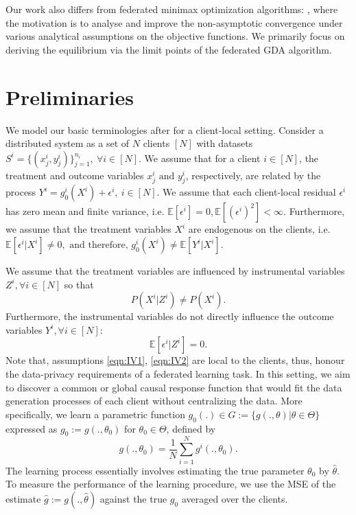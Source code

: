 \documentclass{article}
\let\cite\relax
\newcommand*{\cite}{\citep}
\newcommand{\E}{\mathbb{E}}
\theoremstyle{definition}
\begin{document}
Our work also differs from federated minimax optimization algorithms: \citet{sharma2022federated, shen2024stochastic, wu2024solving, zhu2024stability}, where the motivation is to analyse and improve the non-asymptotic convergence under various analytical assumptions on the objective functions. We primarily focus on deriving the equilibrium via the limit points of the federated GDA algorithm.



\section{Preliminaries}
\label{sec:prelim}		
We model our basic terminologies after \cite{bennett2019deep} for a client-local setting. Consider a distributed system as a set of $N$ clients $[N]$ with datasets $S^i = \{(x_j^i,y_j^i)\}_{j=1}^{n_i},~\forall i\in[N]$. We assume that for a client $i\in[N]$, the treatment and outcome variables $x_j^i\text{ and }y_j^i$, respectively, are related by the process $
	Y^i=g_0^i(X^i) + \epsilon^i, ~i \in [N].
$
We assume that each client-local residual $\epsilon^i$ has zero mean and finite variance, i.e. $
\E[\epsilon^i] = 0, \E[({\epsilon^i})^2] < \infty. 
$
Furthermore, we assume that the treatment variables $X^i$ are endogenous on the clients, i.e. $
\E[\epsilon^i|X^i] \ne 0,\text{ and therefore, } g_0^i(X^i) \ne \E[Y^i|X^i].
$

We assume that the treatment variables are influenced by instrumental variables  $Z^i, \forall 	i\in[N]$ so that  
\begin{equation}\label{eqn:IV1}
	P(X^i|Z^i)\ne P(X^i).
\end{equation}
Furthermore, the instrumental variables do not directly influence the outcome variables $Y^i, \forall i\in[N]$:
\begin{equation}\label{eqn:IV2}
\E[\epsilon^i|Z^i] = 0.
\end{equation}
Note that, assumptions \ref{eqn:IV1}, \ref{eqn:IV2} are local to the clients, thus, honour the data-privacy requirements of a federated learning task. In this setting, we aim to discover a common or global causal response function that would fit the data generation processes of each client without centralizing the data. More specifically, we learn a parametric function $g_0(.)\in G:=\{g(.,\theta)|\theta\in\Theta\}$ expressed as $g_0:=g(.,\theta_0)$ for $\theta_0\in \Theta$, defined by
\begin{equation}\label{eqn:fedg}
	g(.,\theta_0) = \frac{1}{N}\sum_{i=1}^{N}g^i(.,\theta_0).
\end{equation}
The learning process essentially involves estimating the true parameter $\theta_0$ by $\hat{\theta}$. To measure the performance of the learning procedure, we use the MSE of the estimate $\hat{g}:=g(.,\hat{\theta})$ against the true $g_0$ averaged over the clients.
\end{document}

